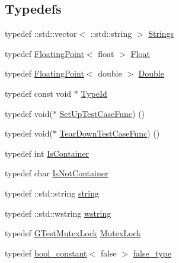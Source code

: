 \subsection*{Typedefs}
\begin{DoxyCompactItemize}
\item 
typedef \+::std\+::vector$<$ \+::std\+::string $>$ \mbox{\hyperlink{namespacetesting_1_1internal_a50003bb76ec2934be1062be11efba8bf}{Strings}}
\item 
typedef \mbox{\hyperlink{classtesting_1_1internal_1_1FloatingPoint}{Floating\+Point}}$<$ float $>$ \mbox{\hyperlink{namespacetesting_1_1internal_a02e1981f5ff70609e6ac06e006ff519a}{Float}}
\item 
typedef \mbox{\hyperlink{classtesting_1_1internal_1_1FloatingPoint}{Floating\+Point}}$<$ double $>$ \mbox{\hyperlink{namespacetesting_1_1internal_a66a7579b1893b260c31dad577f7a5c48}{Double}}
\item 
typedef const void $\ast$ \mbox{\hyperlink{namespacetesting_1_1internal_ab1114197d3c657d8b7f8e0c5caa12d00}{Type\+Id}}
\item 
typedef void($\ast$ \mbox{\hyperlink{namespacetesting_1_1internal_a30037044c0b57cdd647c7e2e97cb2cff}{Set\+Up\+Test\+Case\+Func}}) ()
\item 
typedef void($\ast$ \mbox{\hyperlink{namespacetesting_1_1internal_a085e31321d0d029c04d2a79234f60c1a}{Tear\+Down\+Test\+Case\+Func}}) ()
\item 
typedef int \mbox{\hyperlink{namespacetesting_1_1internal_ad8f0c2883245f1df2a53618a49f0deb3}{Is\+Container}}
\item 
typedef char \mbox{\hyperlink{namespacetesting_1_1internal_abf080521ce135deb510e0a7830fd3d33}{Is\+Not\+Container}}
\item 
typedef \+::std\+::string \mbox{\hyperlink{namespacetesting_1_1internal_a8e8ff5b11e64078831112677156cb111}{string}}
\item 
typedef \+::std\+::wstring \mbox{\hyperlink{namespacetesting_1_1internal_a3f543179329c353aee1d7b54a9a8e335}{wstring}}
\item 
typedef \mbox{\hyperlink{classtesting_1_1internal_1_1GTestMutexLock}{G\+Test\+Mutex\+Lock}} \mbox{\hyperlink{namespacetesting_1_1internal_a08b187c6cc4e28400aadf9a32fccc8de}{Mutex\+Lock}}
\item 
typedef \mbox{\hyperlink{structtesting_1_1internal_1_1bool__constant}{bool\+\_\+constant}}$<$ false $>$ \mbox{\hyperlink{namespacetesting_1_1internal_abb1d0789f19bdde21affccbd1078b525}{false\+\_\+type}}
\item 

\end{DoxyCompactItemize}
